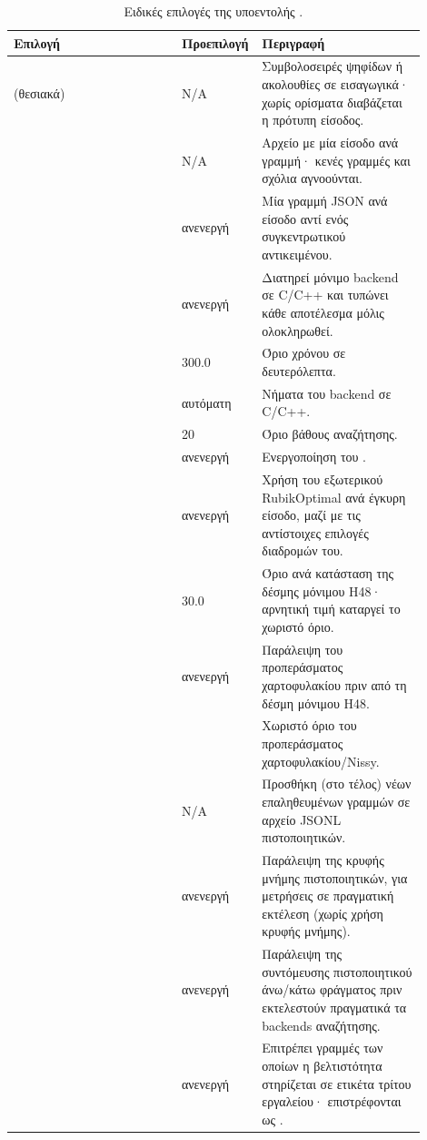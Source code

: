 \begin{table}[htbp]\centering
\small
\begin{tabular}{@{}L{0.40\linewidth}L{0.11\linewidth}L{0.39\linewidth}@{}}
\hline
Επιλογή & Προεπιλογή & Περιγραφή \\
\hline
{} (θεσιακά) & N/A & Συμβολοσειρές ψηφίδων ή ακολουθίες σε εισαγωγικά· χωρίς ορίσματα διαβάζεται η πρότυπη είσοδος. \\
 & N/A & Αρχείο με μία είσοδο ανά γραμμή· κενές γραμμές και σχόλια αγνοούνται. \\
 & ανενεργή & Μία γραμμή JSON ανά είσοδο αντί ενός συγκεντρωτικού αντικειμένου. \\
 & ανενεργή & Διατηρεί μόνιμο backend σε C/C++ και τυπώνει κάθε αποτέλεσμα μόλις ολοκληρωθεί. \\
 & 300.0 & Όριο χρόνου σε δευτερόλεπτα. \\
 & αυτόματη & Νήματα του backend σε C/C++. \\
 & 20 & Όριο βάθους αναζήτησης. \\
 & ανενεργή & Ενεργοποίηση του . \\
 & ανενεργή & Χρήση του εξωτερικού RubikOptimal ανά έγκυρη είσοδο, μαζί με τις αντίστοιχες επιλογές διαδρομών του. \\
 & 30.0 & Όριο ανά κατάσταση της δέσμης μόνιμου H48· αρνητική τιμή καταργεί το χωριστό όριο. \\
\allowbreak{} & ανενεργή & Παράλειψη του προπεράσματος χαρτοφυλακίου πριν από τη δέσμη μόνιμου H48. \\
\allowbreak{} &  & Χωριστό όριο του προπεράσματος χαρτοφυλακίου/Nissy. \\
 & N/A & Προσθήκη (στο τέλος) νέων επαληθευμένων  γραμμών σε αρχείο JSONL πιστοποιητικών. \\
\allowbreak{} & ανενεργή & Παράλειψη της κρυφής μνήμης πιστοποιητικών, για μετρήσεις σε πραγματική εκτέλεση (χωρίς χρήση κρυφής μνήμης). \\
\allowbreak{} & ανενεργή & Παράλειψη της συντόμευσης πιστοποιητικού άνω/κάτω φράγματος πριν εκτελεστούν πραγματικά τα backends αναζήτησης. \\
\allowbreak{}\allowbreak{} & ανενεργή & Επιτρέπει γραμμές των οποίων η βελτιστότητα στηρίζεται σε ετικέτα τρίτου εργαλείου· επιστρέφονται ως . \\
\hline
\end{tabular}
\caption{Ειδικές επιλογές της υποεντολής .}
\label{tab:cli-oracle}
\end{table}

